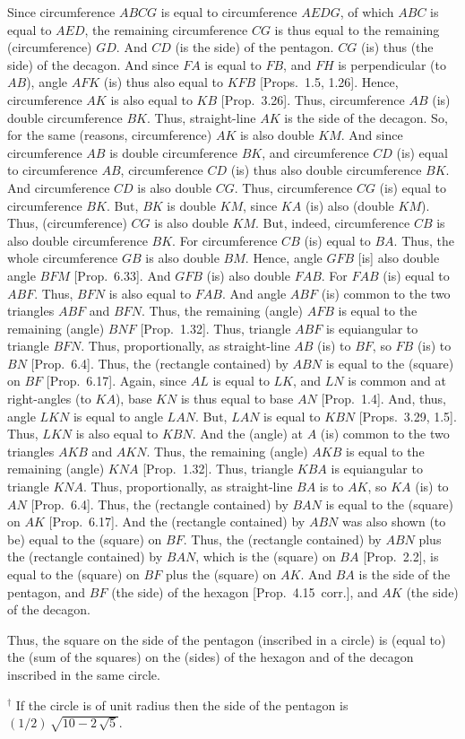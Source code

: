 \begin{Parallel}{}{}
{Since circumference $ABCG$ is equal to circumference $AEDG$,
of which $ABC$ is equal to $AED$, the remaining circumference
$CG$ is thus equal to the remaining (circumference) $GD$. And $CD$ (is the side) of the pentagon. 
$CG$ (is) thus (the side) of the decagon. And since  $FA$ is equal to $FB$,
and $FH$ is perpendicular (to $AB$), angle $AFK$ (is) thus also equal
to $KFB$ [Props.~1.5, 1.26]. Hence, circumference $AK$
is also equal to $KB$ [Prop.~3.26]. Thus, circumference $AB$ (is)
double circumference $BK$. Thus, straight-line $AK$ is the side of the decagon. 
So, for the same (reasons, circumference)  $AK$ is also double $KM$. And since
circumference $AB$ is double circumference $BK$, and
circumference $CD$ (is) equal to circumference $AB$, circumference
$CD$ (is) thus also double circumference $BK$. And
circumference $CD$ is also double $CG$. Thus, circumference
$CG$ (is) equal to circumference $BK$. But, $BK$
is double $KM$, since $KA$ (is) also (double $KM$). Thus,
(circumference) $CG$ is also double $KM$. But, indeed, circumference $CB$ is also
double circumference $BK$. For circumference $CB$ (is) equal to $BA$. 
Thus, the whole circumference $GB$ is also double $BM$. 
Hence, angle $GFB$ [is] also double  angle $BFM$ [Prop.~6.33].
And $GFB$ (is) also double $FAB$. For $FAB$ (is) equal to $ABF$. 
Thus, $BFN$ is also equal to $FAB$. And angle $ABF$ (is) common
to the two triangles $ABF$ and $BFN$. Thus, the
remaining (angle) $AFB$ is equal to the remaining (angle) $BNF$
[Prop.~1.32]. Thus, triangle $ABF$ is equiangular to triangle
$BFN$. Thus, proportionally, as straight-line $AB$ (is) to
$BF$, so $FB$ (is) to $BN$ [Prop.~6.4]. Thus, the (rectangle contained)
by $ABN$ is equal to the (square) on $BF$ [Prop.~6.17]. Again,
since $AL$ is equal to $LK$, and $LN$ is common and at right-angles (to $KA$), 
base $KN$ is thus equal to base $AN$  [Prop.~1.4]. And, thus, angle
$LKN$ is equal to angle $LAN$. But, $LAN$ is equal to
$KBN$ [Props.~3.29, 1.5]. Thus, $LKN$ is also equal to $KBN$. 
And the (angle) at $A$ (is) common to the two triangles $AKB$ and
$AKN$. Thus, the remaining (angle) $AKB$ is equal to the
remaining (angle) $KNA$ [Prop.~1.32]. Thus, triangle $KBA$ is
equiangular to triangle $KNA$. Thus, proportionally, as straight-line
$BA$ is to $AK$, so $KA$ (is) to $AN$ [Prop.~6.4]. Thus, the
(rectangle contained) by $BAN$ is equal to the (square) on $AK$ [Prop.~6.17]. 
And  the (rectangle contained) by $ABN$ was also shown (to be)
equal to the (square) on $BF$. Thus, the (rectangle contained) by $ABN$
plus the (rectangle contained) by $BAN$, which is the (square) on $BA$
[Prop.~2.2],
is equal to the (square) on $BF$ plus the (square) on $AK$. 
And $BA$ is the side of the pentagon, and $BF$ (the side) of the hexagon
[Prop.~4.15~corr.], and $AK$ (the side) of the decagon.

Thus, the square on the side of the pentagon  (inscribed in a circle) is (equal to) the (sum of the squares)
on the (sides) of the hexagon and of  the decagon inscribed in the
same circle.}
\end{Parallel}
{\footnotesize\noindent$^\dag$ If the circle is of unit radius then the side
of the pentagon is $(1/2)\,\sqrt{10-2\,\sqrt{5}}$.}

